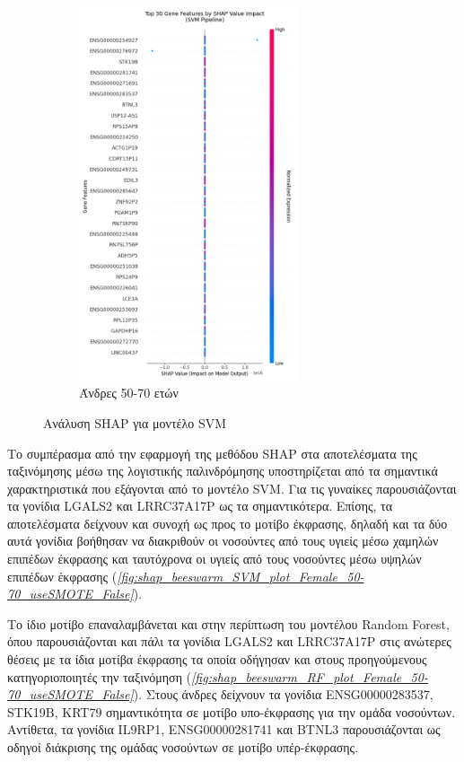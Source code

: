 \documentclass[12pt]{report}
\begin{document}
\begin{figure}[H]
\begin{subfigure}[b]{0.45\textwidth}
                    \includegraphics[height=11cm,width=\textwidth,keepaspectratio]{ML/Predict/DEG/SHAP/SVM/shap_beeswarm_plot_Male_50-70_useSMOTE_False.png}
                    \caption{Άνδρες 50-70 ετών}
                    \label{fig:shap_beeswarm_SVM_plot_Male_50-70_useSMOTE_False}
                \end{subfigure}
                \caption{Ανάλυση SHAP για μοντέλο SVM}
                \label{fig:beeswarm-shap-50-70-svm-classifier}
            \end{figure}
        \par
            Το συμπέρασμα από την εφαρμογή της μεθόδου SHAP στα αποτελέσματα της ταξινόμησης μέσω της λογιστικής παλινδρόμησης υποστηρίζεται από τα σημαντικά χαρακτηριστικά που εξάγονται από το μοντέλο SVM. Για τις γυναίκες παρουσιάζονται τα γονίδια LGALS2 και LRRC37A17P ως τα σημαντικότερα. Επίσης, τα αποτελέσματα δείχνουν και συνοχή ως προς το μοτίβο έκφρασης, δηλαδή και τα δύο αυτά γονίδια βοήθησαν να διακριθούν οι νοσούντες από τους υγιείς μέσω χαμηλών επιπέδων έκφρασης και ταυτόχρονα οι υγιείς από τους νοσούντες μέσω υψηλών επιπέδων έκφρασης (\emph{\ref{fig:shap_beeswarm_SVM_plot_Female_50-70_useSMOTE_False}}).
        \par
            Το ίδιο μοτίβο επαναλαμβάνεται και στην περίπτωση του μοντέλου Random Forest, όπου παρουσιάζονται και πάλι τα γονίδια LGALS2 και LRRC37A17P στις ανώτερες θέσεις με τα ίδια μοτίβα έκφρασης τα οποία οδήγησαν και στους προηγούμενους κατηγοριοποιητές την ταξινόμηση (\emph{\ref{fig:shap_beeswarm_RF_plot_Female_50-70_useSMOTE_False}}). Στους άνδρες δείχνουν τα γονίδια ENSG00000283537, STK19B, KRT79 σημαντικότητα σε μοτίβο υπο-έκφρασης για την ομάδα νοσούντων. Αντίθετα, τα γονίδια IL9RP1, ENSG00000281741 και BTNL3 παρουσιάζονται ως οδηγοί διάκρισης της ομάδας νοσούντων σε μοτίβο υπέρ-έκφρασης.
\end{document}

